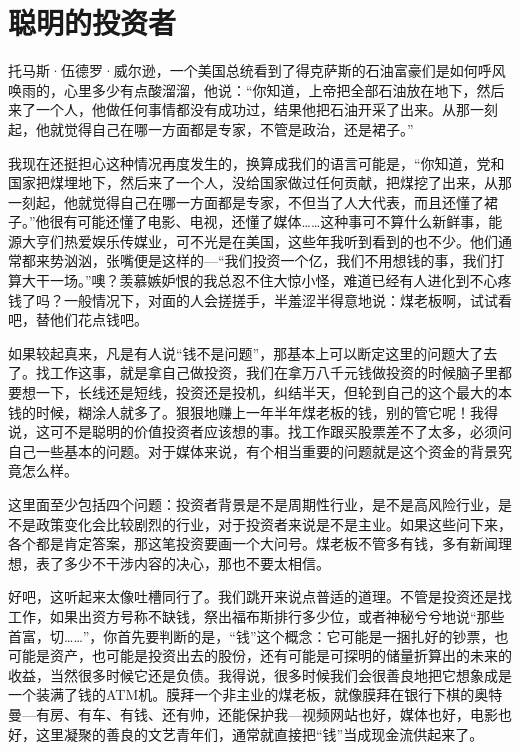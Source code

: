 \section{聪明的投资者}

托马斯·伍德罗·威尔逊，一个美国总统看到了得克萨斯的石油富豪们是如何呼风唤雨的，心里多少有点酸溜溜，他说：``你知道，上帝把全部石油放在地下，然后来了一个人，他做任何事情都没有成功过，结果他把石油开采了出来。从那一刻起，他就觉得自己在哪一方面都是专家，不管是政治，还是裙子。''

我现在还挺担心这种情况再度发生的，换算成我们的语言可能是，``你知道，党和国家把煤埋地下，然后来了一个人，没给国家做过任何贡献，把煤挖了出来，从那一刻起，他就觉得自己在哪一方面都是专家，不但当了人大代表，而且还懂了裙子。''他很有可能还懂了电影、电视，还懂了媒体\ldots{}\ldots{}这种事可不算什么新鲜事，能源大亨们热爱娱乐传媒业，可不光是在美国，这些年我听到看到的也不少。他们通常都来势汹汹，张嘴便是这样的---``我们投资一个亿，我们不用想钱的事，我们打算大干一场。''噢？羡慕嫉妒恨的我总忍不住大惊小怪，难道已经有人进化到不心疼钱了吗？一般情况下，对面的人会搓搓手，半羞涩半得意地说：煤老板啊，试试看吧，替他们花点钱吧。

如果较起真来，凡是有人说``钱不是问题''，那基本上可以断定这里的问题大了去了。找工作这事，就是拿自己做投资，我们在拿万八千元钱做投资的时候脑子里都要想一下，长线还是短线，投资还是投机，纠结半天，但轮到自己的这个最大的本钱的时候，糊涂人就多了。狠狠地赚上一年半年煤老板的钱，别的管它呢！我得说，这可不是聪明的价值投资者应该想的事。找工作跟买股票差不了太多，必须问自己一些基本的问题。对于媒体来说，有个相当重要的问题就是这个资金的背景究竟怎么样。

这里面至少包括四个问题：投资者背景是不是周期性行业，是不是高风险行业，是不是政策变化会比较剧烈的行业，对于投资者来说是不是主业。如果这些问下来，各个都是肯定答案，那这笔投资要画一个大问号。煤老板不管多有钱，多有新闻理想，表了多少不干涉内容的决心，那也不要太相信。

好吧，这听起来太像吐槽同行了。我们跳开来说点普适的道理。不管是投资还是找工作，如果出资方号称不缺钱，祭出福布斯排行多少位，或者神秘兮兮地说``那些首富，切\ldots{}\ldots{}''，你首先要判断的是，``钱''这个概念：它可能是一捆扎好的钞票，也可能是资产，也可能是投资出去的股份，还有可能是可探明的储量折算出的未来的收益，当然很多时候它还是负债。我得说，很多时候我们会很善良地把它想象成是一个装满了钱的ATM机。膜拜一个非主业的煤老板，就像膜拜在银行下棋的奥特曼---有房、有车、有钱、还有帅，还能保护我---视频网站也好，媒体也好，电影也好，这里凝聚的善良的文艺青年们，通常就直接把``钱''当成现金流供起来了。

